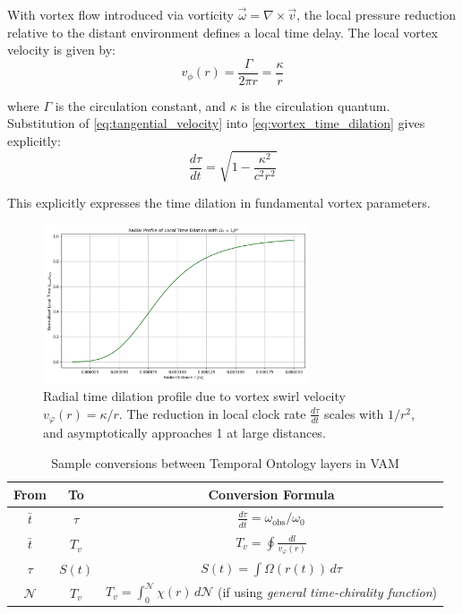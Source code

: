 With vortex flow introduced via vorticity $\vec{\omega} = \nabla \times \vec{v}$, the local pressure reduction relative to the distant environment defines a local time delay. The local vortex velocity is given by:
\begin{equation}\label{eq:tangential_velocity}
v_{\phi}(r) = \frac{\Gamma}{2\pi r} = \frac{\kappa}{r}
\end{equation}

where $\Gamma$ is the circulation constant, and $\kappa$ is the circulation quantum. Substitution of \eqref{eq:tangential_velocity} into \eqref{eq:vortex_time_dilation} gives explicitly:
\begin{equation}\label{eq:vortex_time_explicit}
\frac{d\tau}{dt} = \sqrt{1 - \frac{\kappa^2}{c^2 r^2}}
\end{equation}

This explicitly expresses the time dilation in fundamental vortex parameters.

\begin{figure}[H]
  \centering
  \includegraphics[width=0.7\textwidth]{images/02-RadialProfileOfLocalTimeDilation_Radial_LocalTime_Dilation}
  \caption{Radial time dilation profile due to vortex swirl velocity \( v_\varphi(r) = \kappa / r \). The reduction in local clock rate \(\frac{d\tau}{dt}\) scales with \(1/r^2\), and asymptotically approaches 1 at large distances.}
  \label{fig:radial_time_dilation}
\end{figure}

\begin{table}[H]
    \centering
    \begin{tabular}{|c|c|c|}
        \hline
        \textbf{From} & \textbf{To} & \textbf{Conversion Formula} \\
        \hline
        $\bar{t}$ & $\tau$ & $\frac{d\tau}{d\bar{t}} = \omega_{\text{obs}} / \omega_0$ \\
        $\bar{t}$ & $T_v$ & $T_v = \oint \frac{dl}{v_\varphi(r)}$ \\
        $\tau$ & $S(t)$ & $S(t) = \int \Omega(r(t))\, d\tau$ \\
        $\mathcal{N}$ & $T_v$ & $T_v = \int_0^{\mathcal{N}} \chi(r) \, d\mathcal{N}$ (if using \textit{general time-chirality function}) \\
        \hline
    \end{tabular}
    \caption{Sample conversions between Temporal Ontology layers in VAM}
\end{table}

